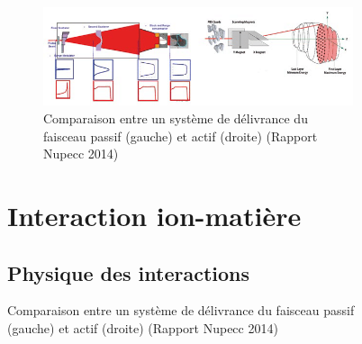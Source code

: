 \documentclass[11pt,a4paper,oldfontcommands]{memoir}
\begin{document}
\begin{figure}
\begin{figure}[h!]
    \centering
    \includegraphics [scale = 0.7]{intro/Passive-left-and-active-right-beam-delivery-system-courtesy-of-IBA.png}
    \caption{Comparaison entre un système de délivrance du faisceau passif (gauche) et actif (droite) (Rapport Nupecc 2014)}
    \label{fig:my_label}
\end{figure}
\openany
\section{Interaction ion-matière}
\subsection{Physique des interactions}


\end{figure}
\end{document}
